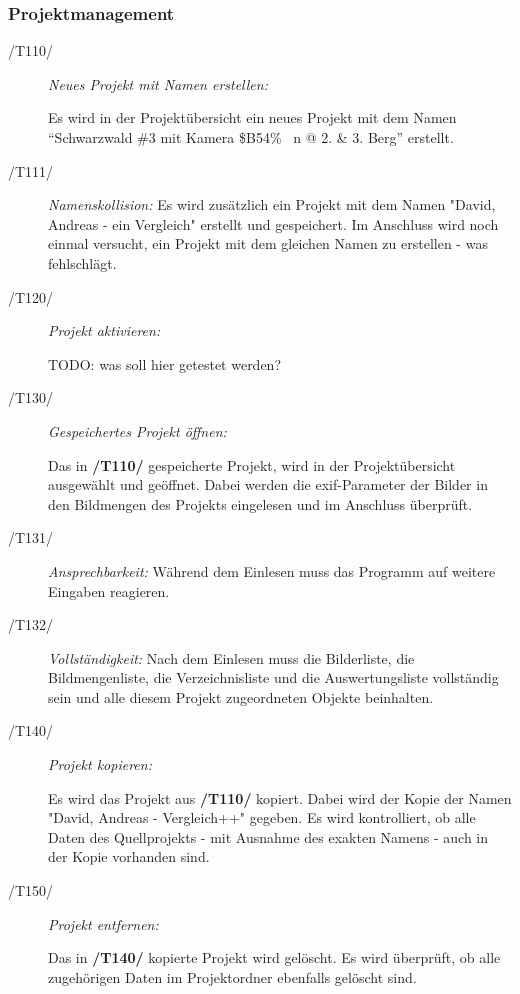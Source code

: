 	\subsubsection{Projektmanagement}
	
		\begin{description}
		
			\item[/T110/] \textit{Neues Projekt mit Namen erstellen:}\par Es wird in der Projektübersicht ein neues Projekt mit dem Namen "`Schwarzwald \#3 mit Kamera \$B54\% ~n @ 2. \& 3. Berg"' erstellt.
			
			\item[/T111/] \textit{Namenskollision:} Es wird zusätzlich ein Projekt mit dem Namen "David, Andreas - ein Vergleich" erstellt und gespeichert. Im Anschluss wird noch einmal versucht, ein Projekt mit dem gleichen Namen zu erstellen - was fehlschlägt.
				
			\item[/T120/] \textit{Projekt aktivieren:}\par TODO: was soll hier getestet werden?
				
			\item[/T130/] \textit{Gespeichertes Projekt öffnen:}\par Das in \textbf{/T110/} gespeicherte Projekt, wird in der Projektübersicht ausgewählt und geöffnet. Dabei werden die \gls{exif}-Parameter der Bilder in den Bildmengen des Projekts eingelesen und im Anschluss überprüft.

			\item[/T131/] \textit{Ansprechbarkeit:}	Während dem Einlesen muss das Programm auf weitere Eingaben reagieren.
			
			\item[/T132/] \textit{Vollständigkeit:} Nach dem Einlesen muss die Bilderliste, die Bildmengenliste, die Verzeichnisliste und die Auswertungsliste vollständig sein und alle diesem Projekt zugeordneten Objekte beinhalten.
			
			\item[/T140/] \textit{Projekt kopieren:}\par Es wird das Projekt aus \textbf{/T110/} kopiert. Dabei wird der Kopie der Namen "David, Andreas - Vergleich++" gegeben. Es wird kontrolliert, ob alle Daten des Quellprojekts - mit Ausnahme des exakten Namens - auch in der Kopie vorhanden sind.
				
			\item[/T150/] \textit{Projekt entfernen:}\par Das in \textbf{/T140/} kopierte Projekt wird gelöscht. Es wird überprüft, ob alle zugehörigen Daten im Projektordner ebenfalls gelöscht sind.
		
		\end{description}
	
